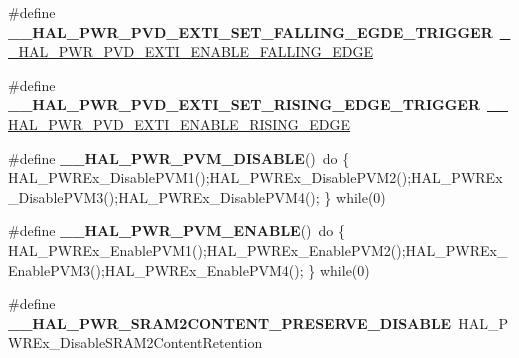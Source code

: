 \begin{DoxyCompactItemize}
\#define {\bfseries \+\_\+\+\_\+\+H\+A\+L\+\_\+\+P\+W\+R\+\_\+\+P\+V\+D\+\_\+\+E\+X\+T\+I\+\_\+\+S\+E\+T\+\_\+\+F\+A\+L\+L\+I\+N\+G\+\_\+\+E\+G\+D\+E\+\_\+\+T\+R\+I\+G\+G\+ER}~\mbox{\hyperlink{group___p_w_r___exported___macro_ga5b971478563a00e1ee1a9d8ca8054e08}{\+\_\+\+\_\+\+H\+A\+L\+\_\+\+P\+W\+R\+\_\+\+P\+V\+D\+\_\+\+E\+X\+T\+I\+\_\+\+E\+N\+A\+B\+L\+E\+\_\+\+F\+A\+L\+L\+I\+N\+G\+\_\+\+E\+D\+GE}}
\item 
\mbox{\label{group___h_a_l___p_w_r___aliased___macros_ga2f1057dd8cf95ab4a33a3dbe5314a5a2}} 
\#define {\bfseries \+\_\+\+\_\+\+H\+A\+L\+\_\+\+P\+W\+R\+\_\+\+P\+V\+D\+\_\+\+E\+X\+T\+I\+\_\+\+S\+E\+T\+\_\+\+R\+I\+S\+I\+N\+G\+\_\+\+E\+D\+G\+E\+\_\+\+T\+R\+I\+G\+G\+ER}~\mbox{\hyperlink{group___p_w_r___exported___macro_ga7bef3f30c9fe267c99d5240fbf3f878c}{\+\_\+\+\_\+\+H\+A\+L\+\_\+\+P\+W\+R\+\_\+\+P\+V\+D\+\_\+\+E\+X\+T\+I\+\_\+\+E\+N\+A\+B\+L\+E\+\_\+\+R\+I\+S\+I\+N\+G\+\_\+\+E\+D\+GE}}
\item 
\mbox{\label{group___h_a_l___p_w_r___aliased___macros_gaec66f2306538bb9002387ceafeb38462}} 
\#define {\bfseries \+\_\+\+\_\+\+H\+A\+L\+\_\+\+P\+W\+R\+\_\+\+P\+V\+M\+\_\+\+D\+I\+S\+A\+B\+LE}()~do \{ H\+A\+L\+\_\+\+P\+W\+R\+Ex\+\_\+\+Disable\+P\+V\+M1();H\+A\+L\+\_\+\+P\+W\+R\+Ex\+\_\+\+Disable\+P\+V\+M2();H\+A\+L\+\_\+\+P\+W\+R\+Ex\+\_\+\+Disable\+P\+V\+M3();H\+A\+L\+\_\+\+P\+W\+R\+Ex\+\_\+\+Disable\+P\+V\+M4(); \} while(0)
\item 
\mbox{\label{group___h_a_l___p_w_r___aliased___macros_ga48b28ca62d86e12f33848cbb20ea16dc}} 
\#define {\bfseries \+\_\+\+\_\+\+H\+A\+L\+\_\+\+P\+W\+R\+\_\+\+P\+V\+M\+\_\+\+E\+N\+A\+B\+LE}()~do \{ H\+A\+L\+\_\+\+P\+W\+R\+Ex\+\_\+\+Enable\+P\+V\+M1();H\+A\+L\+\_\+\+P\+W\+R\+Ex\+\_\+\+Enable\+P\+V\+M2();H\+A\+L\+\_\+\+P\+W\+R\+Ex\+\_\+\+Enable\+P\+V\+M3();H\+A\+L\+\_\+\+P\+W\+R\+Ex\+\_\+\+Enable\+P\+V\+M4(); \} while(0)
\item 
\mbox{\label{group___h_a_l___p_w_r___aliased___macros_ga3cd8ad30e5e9e533d0a60fecfc541f03}} 
\#define {\bfseries \+\_\+\+\_\+\+H\+A\+L\+\_\+\+P\+W\+R\+\_\+\+S\+R\+A\+M2\+C\+O\+N\+T\+E\+N\+T\+\_\+\+P\+R\+E\+S\+E\+R\+V\+E\+\_\+\+D\+I\+S\+A\+B\+LE}~H\+A\+L\+\_\+\+P\+W\+R\+Ex\+\_\+\+Disable\+S\+R\+A\+M2\+Content\+Retention
\item 

\end{DoxyCompactItemize}
